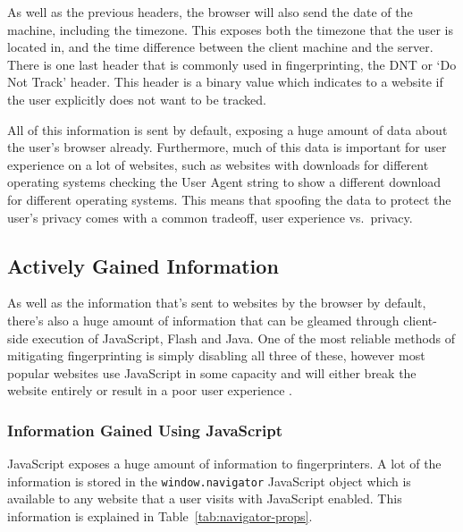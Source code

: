 As well as the previous headers, the browser will also send the date of the machine, including the timezone.
This exposes both the timezone that the user is located in, and the time difference between the client machine and the server.
There is one last header that is commonly used in fingerprinting, the DNT or `Do Not Track' header.
This header is a binary value which indicates to a website if the user explicitly does not want to be tracked.

All of this information is sent by default, exposing a huge amount of data about the user's browser already.
Furthermore, much of this data is important for user experience on a lot of websites, such as websites with downloads for different operating systems checking the User Agent string to show a different download for different operating systems.
This means that spoofing the data to protect the user's privacy comes with a common tradeoff, user experience vs.\ privacy.

\subsection{Actively Gained Information}

As well as the information that's sent to websites by the browser by default, there's also a huge amount of information that can be gleamed through client-side execution of JavaScript, Flash and Java.
One of the most reliable methods of mitigating fingerprinting is simply disabling all three of these, however most popular websites use JavaScript in some capacity and will either break the website entirely or result in a poor user experience \citep{disable-js}.

\subsubsection{Information Gained Using JavaScript}

JavaScript exposes a huge amount of information to fingerprinters.
A lot of the information is stored in the \texttt{window.navigator} JavaScript object which is available to any website that a user visits with JavaScript enabled.
This information is explained in Table~\ref{tab:navigator-props}.

